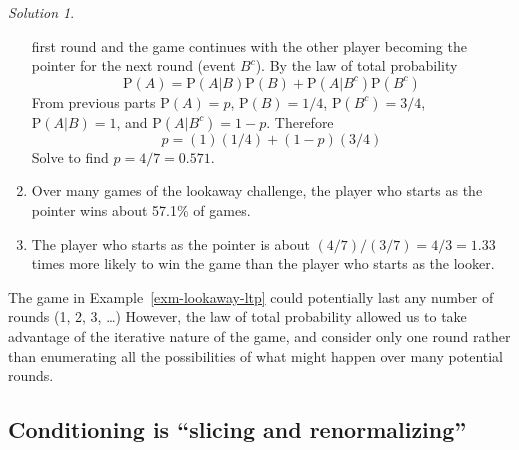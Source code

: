 \documentclass[
  letterpaper,
  DIV=11,
  numbers=noendperiod]{scrreprt}
\theoremstyle{plain}
\theoremstyle{definition}
\theoremstyle{definition}
\theoremstyle{definition}
\theoremstyle{remark}
\newtheorem{refsolution}{Solution}[chapter]
\begin{document}
\begin{tcolorbox}
\begin{refsolution}
\begin{enumerate}
  first round and the game continues with the other player becoming the
  pointer for the next round (event \(B^c\)). By the law of total
  probability \[
  \textrm{P}(A) = \textrm{P}(A|B)\textrm{P}(B) + \textrm{P}(A|B^c)\textrm{P}(B^c)
  \] From previous parts \(\textrm{P}(A)=p\), \(\textrm{P}(B)=1/4\),
  \(\textrm{P}(B^c)=3/4\), \(\textrm{P}(A|B) = 1\), and
  \(\textrm{P}(A|B^c)=1-p\). Therefore \[
  p = (1)(1/4)+ (1-p)(3/4)
  \] Solve to find \(p=4/7= 0.571\).
\item
  Over many games of the lookaway challenge, the player who starts as
  the pointer wins about 57.1\% of games.
\item
  The player who starts as the pointer is about
  \((4/7)/(3/7) = 4/3= 1.33\) times more likely to win the game than the
  player who starts as the looker.
\end{enumerate}

\label{sol-lookaway-ltp}

\end{refsolution}

\end{tcolorbox}

The game in Example~\ref{exm-lookaway-ltp} could potentially last any
number of rounds (1, 2, 3, \ldots) However, the law of total probability
allowed us to take advantage of the iterative nature of the game, and
consider only one round rather than enumerating all the possibilities of
what might happen over many potential rounds.

\subsection{Conditioning is ``slicing and
renormalizing''}\label{conditioning-is-slicing-and-renormalizing}
\end{document}
